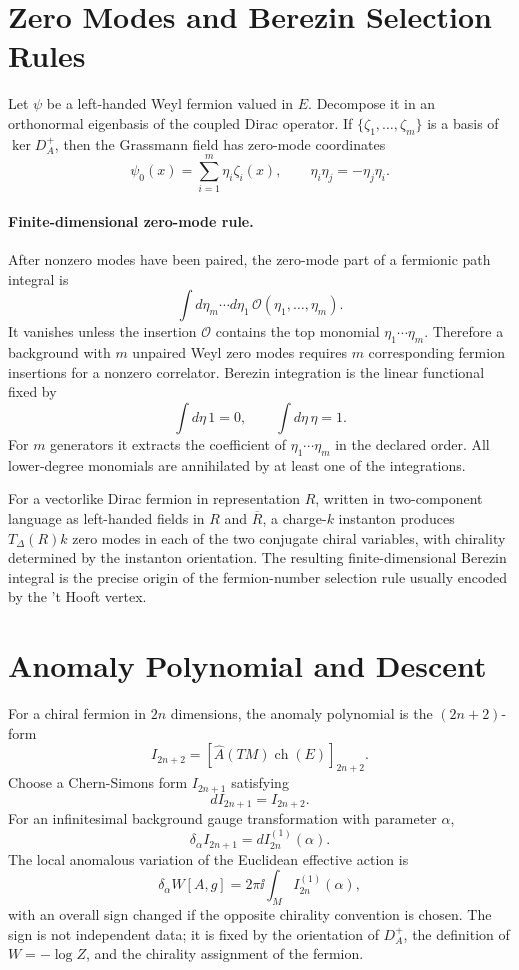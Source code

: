 \section{Zero Modes and Berezin Selection Rules}

Let \(\psi\) be a left-handed Weyl fermion valued in \(E\).  Decompose it in
an orthonormal eigenbasis of the coupled Dirac operator.  If
\(\{\zeta_1,\ldots,\zeta_m\}\) is a basis of \(\ker D_A^+\), then the
Grassmann field has zero-mode coordinates
\[
  \psi_0(x)=\sum_{i=1}^m\eta_i\zeta_i(x),
  \qquad \eta_i\eta_j=-\eta_j\eta_i .
\]

\paragraph{Finite-dimensional zero-mode rule.}
After nonzero modes have been paired, the zero-mode part of a fermionic path
integral is
\[
  \int d\eta_m\cdots d\eta_1\,\mathcal O(\eta_1,\ldots,\eta_m).
\]
It vanishes unless the insertion \(\mathcal O\) contains the top monomial
\(\eta_1\cdots\eta_m\).  Therefore a background with \(m\) unpaired Weyl
zero modes requires \(m\) corresponding fermion insertions for a nonzero
correlator.
Berezin integration is the linear functional fixed by
\[
  \int d\eta\,1=0,
  \qquad
  \int d\eta\,\eta=1.
\]
For \(m\) generators it extracts the coefficient of
\(\eta_1\cdots\eta_m\) in the declared order.  All lower-degree monomials are
annihilated by at least one of the integrations.

For a vectorlike Dirac fermion in representation \(R\), written in
two-component language as left-handed fields in \(R\) and \(\overline R\),
a charge-\(k\) instanton produces \(T_\Delta(R)k\) zero modes in each of the
two conjugate chiral variables, with chirality determined by the instanton
orientation.  The resulting finite-dimensional Berezin integral is the
precise origin of the fermion-number selection rule usually encoded by the
't Hooft vertex.

\section{Anomaly Polynomial and Descent}

For a chiral fermion in \(2n\) dimensions, the anomaly polynomial is the
\((2n+2)\)-form
\begin{equation}
  I_{2n+2}
  =
  \left[\widehat A(TM)\operatorname{ch}(E)\right]_{2n+2}.
  \label{eq:index-anomaly-polynomial}
\end{equation}
Choose a Chern-Simons form \(I_{2n+1}\) satisfying
\[
  dI_{2n+1}=I_{2n+2}.
\]
For an infinitesimal background gauge transformation with parameter
\(\alpha\),
\[
  \delta_\alpha I_{2n+1}=dI_{2n}^{(1)}(\alpha).
\]
The local anomalous variation of the Euclidean effective action is
\begin{equation}
  \delta_\alpha W[A,g]
  =
  2\pi\ii\int_M I_{2n}^{(1)}(\alpha),
  \label{eq:index-local-descent-variation}
\end{equation}
with an overall sign changed if the opposite chirality convention is chosen.
The sign is not independent data; it is fixed by the orientation of
\(D_A^+\), the definition of \(W=-\log Z\), and the chirality assignment of
the fermion.

